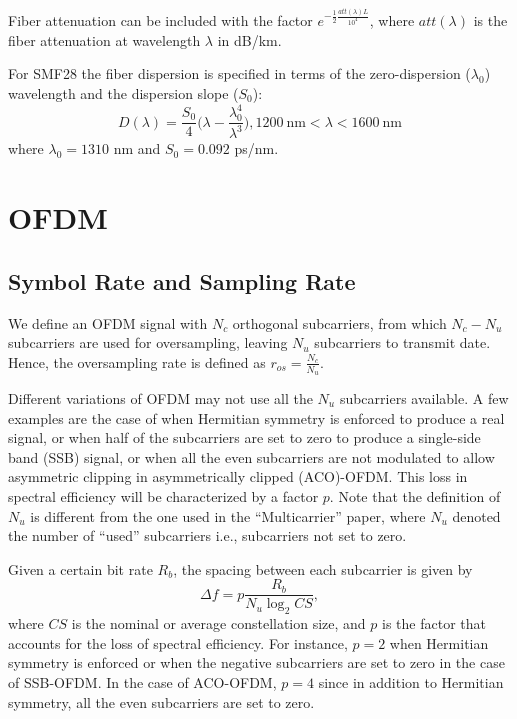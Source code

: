 \documentclass[a4paper]{article}
\begin{document}
Fiber attenuation can be included with the factor $e^{-\frac{1}{2}\frac{att(\lambda)L}{10^4}}$, where $att(\lambda)$ is the fiber attenuation at wavelength $\lambda$ in dB/km.

For SMF28 the fiber dispersion is specified in terms of the zero-dispersion ($\lambda_0$) wavelength and the dispersion slope ($S_0$):
\begin{equation}
D(\lambda) = \frac{S_0}{4}\bigg(\lambda - \frac{\lambda_0^4}{\lambda^3}\bigg), 1200~\text{nm} < \lambda < 1600~\text{nm}
\end{equation}
where $\lambda_0 = 1310$ nm and $S_0 = 0.092$ ps/nm.

\section{OFDM}

\subsection{Symbol Rate and Sampling Rate}

We define an OFDM signal with $N_c$ orthogonal subcarriers, from which $N_c - N_u$ subcarriers are used for oversampling, leaving $N_u$ subcarriers to transmit date. Hence, the oversampling rate is defined as $r_{os} = \frac{N_c}{N_u}$. 

Different variations of OFDM may not use all the $N_u$ subcarriers available. A few examples are the case of when Hermitian symmetry is enforced to produce a real signal, or when half of the subcarriers are set to zero to produce a single-side band (SSB) signal, or when all the even subcarriers are not modulated to allow asymmetric clipping in asymmetrically clipped (ACO)-OFDM. This loss in spectral efficiency will be characterized by a factor $p$. Note that the definition of $N_u$ is different from the one used in the ``Multicarrier'' paper, where $N_u$ denoted the number of ``used'' subcarriers i.e., subcarriers not set to zero. 

Given a certain bit rate $R_b$, the spacing between each subcarrier is given by
\begin{equation} \label{eq:ofdm-subcarrier-spacing}
\Delta f = p\frac{R_b}{N_u\log_2 CS},
\end{equation}
where $CS$ is the nominal or average constellation size, and $p$ is the factor that accounts for the loss of spectral efficiency. For instance, $p = 2$ when Hermitian symmetry is enforced or when the negative subcarriers are set to zero in the case of SSB-OFDM. In the case of ACO-OFDM, $p = 4$ since in addition to Hermitian symmetry, all the even subcarriers are set to zero. 
\end{document}

